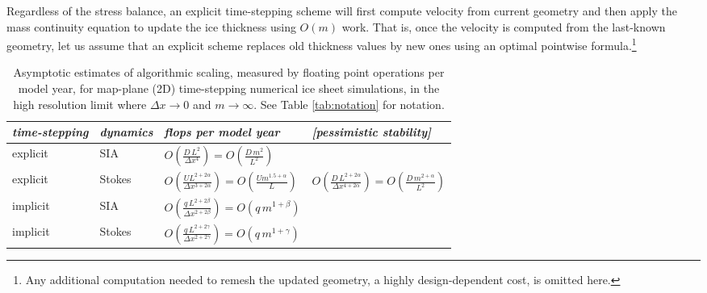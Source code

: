 \documentclass[review,letterpaper]{igs}
\begin{document}
Regardless of the stress balance, an explicit time-stepping scheme will first compute velocity from current geometry and then apply the mass continuity equation to update the ice thickness using $O(m)$ work.  That is, once the velocity is computed from the last-known geometry, let us assume that an explicit scheme replaces old thickness values by new ones using an optimal pointwise formula.\footnote{Any additional computation needed to remesh the updated geometry, a highly design-dependent cost, is omitted here.}

\newcommand{\oo}[1]{\displaystyle O\left(#1\right)}
\setlength{\tabcolsep}{5pt}
\renewcommand{\arraystretch}{1.5}
\begin{table*}[ht]
{\normalsize
\begin{tabular}{llll}
\emph{time-stepping} & \emph{dynamics} & \emph{flops per model year} & \emph{[pessimistic stability]} \\ \hline
explicit & SIA    & $\oo{\frac{D\, L^2}{\Delta x^4}} = \oo{\frac{D\, m^2}{L^2}}${\Huge \strut} \\
explicit & Stokes & $\oo{\frac{U L^{2+2\alpha}}{\Delta x^{3+2\alpha}}} = \oo{\frac{U m^{1.5+\alpha}}{L}}${\Huge \strut}\phantom{x} & $\oo{\frac{D\, L^{2+2\alpha}}{\Delta x^{4+2\alpha}}} = \oo{\frac{D\,m^{2+\alpha}}{L^2}}$ \\
implicit & SIA    & $\oo{\frac{q\, L^{2+2\beta}}{\Delta x^{2+2\beta}}} = \oo{q\, m^{1+\beta}}${\Huge \strut} \\
implicit & Stokes & $\oo{\frac{q\, L^{2+2\gamma}}{\Delta x^{2+2\gamma}}} = \oo{q\, m^{1+\gamma}}${\Huge \strut}
\end{tabular}
}
\caption{Asymptotic estimates of algorithmic scaling, measured by floating point operations per model year, for map-plane (2D) time-stepping numerical ice sheet simulations, in the high resolution limit where $\Delta x\to 0$ and $m\to\infty$.  See Table \ref{tab:notation} for notation.}
\label{tab:performancemodel}
\end{table*}
\end{document}
